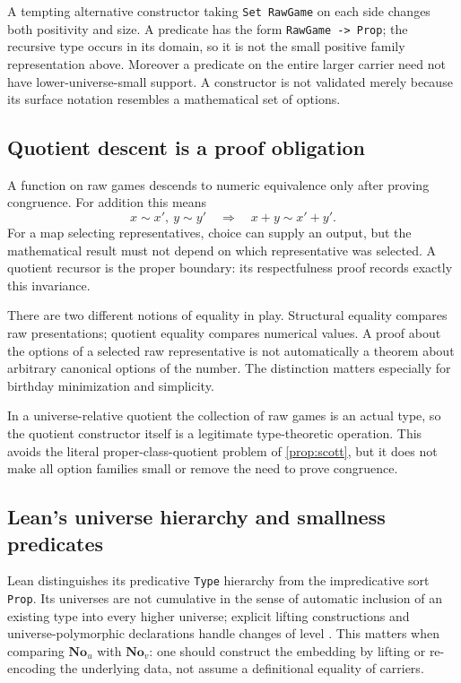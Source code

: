 \documentclass[11pt,letterpaper]{article}
\numberwithin{equation}{section}
\theoremstyle{definition}
\theoremstyle{remark}
\newcommand{\No}{\mathbf{No}}
\begin{document}
A tempting alternative constructor taking \texttt{Set RawGame} on each side changes both positivity and size. A predicate has the form \texttt{RawGame -> Prop}; the recursive type occurs in its domain, so it is not the small positive family representation above. Moreover a predicate on the entire larger carrier need not have lower-universe-small support. A constructor is not validated merely because its surface notation resembles a mathematical set of options.

\subsection{Quotient descent is a proof obligation}
A function on raw games descends to numeric equivalence only after proving congruence. For addition this means
\[
x\sim x',\ y\sim y'\quad\Longrightarrow\quad x+y\sim x'+y'.
\]
For a map selecting representatives, choice can supply an output, but the mathematical result must not depend on which representative was selected. A quotient recursor is the proper boundary: its respectfulness proof records exactly this invariance.

There are two different notions of equality in play. Structural equality compares raw presentations; quotient equality compares numerical values. A proof about the options of a selected raw representative is not automatically a theorem about arbitrary canonical options of the number. The distinction matters especially for birthday minimization and simplicity.

In a universe-relative quotient the collection of raw games is an actual type, so the quotient constructor itself is a legitimate type-theoretic operation. This avoids the literal proper-class-quotient problem of \cref{prop:scott}, but it does not make all option families small or remove the need to prove congruence.

\subsection{Lean's universe hierarchy and smallness predicates}
Lean distinguishes its predicative \texttt{Type} hierarchy from the impredicative sort \texttt{Prop}. Its universes are not cumulative in the sense of automatic inclusion of an existing type into every higher universe; explicit lifting constructions and universe-polymorphic declarations handle changes of level \cite{LeanUniverses}. This matters when comparing $\No_u$ with $\No_v$: one should construct the embedding by lifting or re-encoding the underlying data, not assume a definitional equality of carriers.
\end{document}
